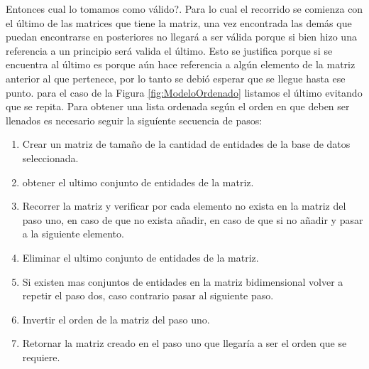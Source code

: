 Entonces cual lo tomamos como v\'alido?.
Para lo cual el  recorrido se comienza con el \'ultimo de las matrices que tiene la matriz, una vez encontrada las dem\'as que puedan encontrarse en posteriores no llegar\'a a ser v\'alida porque si bien hizo una referencia a un principio ser\'a valida el \'ultimo. Esto se justifica porque si se encuentra al \'ultimo es porque a\'un hace referencia a alg\'un elemento de la matriz anterior al que pertenece, por lo tanto se debi\'o esperar que se llegue hasta ese punto. para el caso de la Figura \ref{fig:ModeloOrdenado} listamos el \'ultimo evitando que se repita.
Para obtener una lista ordenada seg\'un el orden en que deben ser llenados es necesario seguir la sigu\'iente secuencia de pasos:
\begin{enumerate}
\item Crear un matriz de tama\~no de la cantidad de entidades de la base de datos seleccionada.
\item obtener el ultimo conjunto de entidades de la matriz.
\item Recorrer la matriz y verificar por cada elemento no exista en la matriz del paso uno, en caso de que no exista a\~nadir, en caso de que si no a\~nadir y pasar a la siguiente elemento.
\item Eliminar el ultimo conjunto de entidades de la matriz.
\item Si existen mas conjuntos de entidades en la matriz bidimensional volver a repetir el paso dos, caso contrario pasar al siguiente paso.
\item Invertir el orden de la matriz del paso uno.
\item Retornar la matriz creado en el paso uno que llegar\'ia a ser el orden que se requiere.
\end{enumerate}

